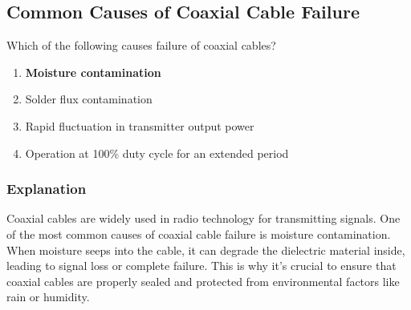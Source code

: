 \subsection{Common Causes of Coaxial Cable Failure}
\label{T7C09}

\begin{tcolorbox}[colback=gray!10!white,colframe=black!75!black,title=T7C09]
Which of the following causes failure of coaxial cables?
\begin{enumerate}[noitemsep]
    \item \textbf{Moisture contamination}
    \item Solder flux contamination
    \item Rapid fluctuation in transmitter output power
    \item Operation at 100\% duty cycle for an extended period
\end{enumerate}
\end{tcolorbox}

\subsubsection*{Explanation}
Coaxial cables are widely used in radio technology for transmitting signals. One of the most common causes of coaxial cable failure is moisture contamination. When moisture seeps into the cable, it can degrade the dielectric material inside, leading to signal loss or complete failure. This is why it's crucial to ensure that coaxial cables are properly sealed and protected from environmental factors like rain or humidity.
